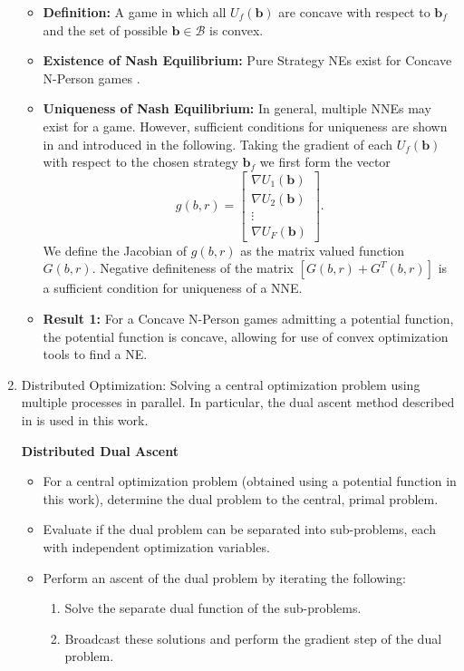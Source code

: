 \documentclass[12pt,a4paper]{report}
\begin{document}
\begin{enumerate}
\begin{itemize}
\item
\textbf{Definition:} A game in which all $U_f(\mathbf{b})$ are concave with respect to $\mathbf{b}_f$ and the set of possible $\textbf{b}\in\mathcal{B}$ is convex. 
\item 
\textbf{Existence of Nash Equilibrium:} Pure Strategy NEs exist for Concave N-Person games \cite[Thm1]{rosen1964existence}. 
\item
\textbf{Uniqueness of Nash Equilibrium:} In general, multiple NNEs may exist for a game. However, sufficient conditions for uniqueness are shown in \cite[Thm4]{rosen1964existence} and introduced in the following. 
Taking the gradient of each $U_f(\mathbf{b})$ with respect to the chosen strategy $\textbf{b}_f$ we first form the vector
\begin{equation}
g(b,r)= 
\begin{bmatrix}
\nabla U_{1}(\mathbf{b})
\\
\nabla U_{2}(\mathbf{b})
\\
\vdots\\
\nabla U_{F}(\mathbf{b})
\end{bmatrix}.
\end{equation}
We define the Jacobian of $g(b,r) $ as the matrix valued function $G(b,r) $.
Negative definiteness of the matrix $[G(b,r)+G^{T}(b,r)] $ is a sufficient condition for uniqueness of a NNE.
\item \textbf{Result 1:} For a Concave N-Person games admitting a potential function, the potential function is concave, allowing for use of convex optimization tools to find a NE. 

\end{itemize}




\item Distributed Optimization: Solving a central optimization problem using multiple processes in parallel.
In particular, the dual ascent method described in \cite{boyd2011distributed} is used in this work.

\textbf{Distributed Dual Ascent} 
\begin{itemize}
\item For a central optimization problem (obtained using a potential function in this work), determine the dual problem to the central, primal problem.
\item Evaluate if the dual problem can be separated into sub-problems, each with independent optimization variables.
\item Perform an ascent of the dual problem by iterating the following:
\begin{enumerate}
\item Solve the separate dual function of the sub-problems.
\item Broadcast these solutions and perform the gradient step of the dual problem.
\end{enumerate}
\end{itemize}


\end{enumerate}
\end{document}
